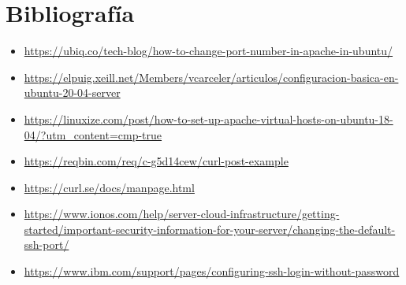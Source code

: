 \documentclass[twoside]{article}
\begin{document}
\section{Bibliografía}
\begin{itemize}
    \item \url{https://ubiq.co/tech-blog/how-to-change-port-number-in-apache-in-ubuntu/}
    \item \url{https://elpuig.xeill.net/Members/vcarceler/articulos/configuracion-basica-en-ubuntu-20-04-server}
    \item \url{https://linuxize.com/post/how-to-set-up-apache-virtual-hosts-on-ubuntu-18-04/?utm_content=cmp-true}
    \item \url{https://reqbin.com/req/c-g5d14cew/curl-post-example}
    \item \url{https://curl.se/docs/manpage.html}
    \item \url{https://www.ionos.com/help/server-cloud-infrastructure/getting-started/important-security-information-for-your-server/changing-the-default-ssh-port/}
    \item \url{https://www.ibm.com/support/pages/configuring-ssh-login-without-password}
\end{itemize}
\end{document}
